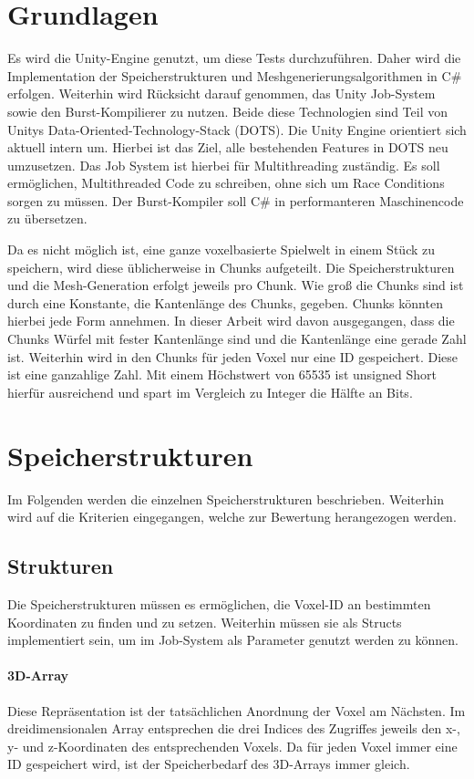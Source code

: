 \documentclass[
a4paper,     %
12pt         %
]{scrartcl}  %
\begin{document}
\section{Grundlagen}
Es wird die Unity-Engine genutzt, um diese Tests durchzuführen. Daher wird die Implementation der Speicherstrukturen und Meshgenerierungsalgorithmen in C\# erfolgen. Weiterhin wird Rücksicht darauf genommen, das Unity Job-System sowie den Burst-Kompilierer zu nutzen. Beide diese Technologien sind Teil von Unitys Data-Oriented-Technology-Stack (DOTS). Die Unity Engine orientiert sich aktuell intern um. Hierbei ist das Ziel, alle bestehenden Features in DOTS neu umzusetzen. Das Job System ist hierbei für Multithreading zuständig. Es soll ermöglichen, Multithreaded Code zu schreiben, ohne sich um Race Conditions sorgen zu müssen. Der Burst-Kompiler soll C\# in performanteren Maschinencode zu übersetzen.

Da es nicht möglich ist, eine ganze voxelbasierte Spielwelt in einem Stück zu speichern, wird diese üblicherweise in Chunks aufgeteilt. Die Speicherstrukturen und die Mesh-Generation erfolgt jeweils pro Chunk. Wie groß die Chunks sind ist durch eine Konstante, die Kantenlänge des Chunks, gegeben. Chunks könnten hierbei jede Form annehmen. In dieser Arbeit wird davon ausgegangen, dass die Chunks Würfel mit fester Kantenlänge sind und die Kantenlänge eine gerade Zahl ist. Weiterhin wird in den Chunks für jeden Voxel nur eine ID gespeichert. Diese ist eine ganzahlige Zahl. Mit einem Höchstwert von 65535 ist unsigned Short hierfür ausreichend und spart im Vergleich zu Integer die Hälfte an Bits.

\section{Speicherstrukturen}
Im Folgenden werden die einzelnen Speicherstrukturen beschrieben. Weiterhin wird auf die Kriterien eingegangen, welche zur Bewertung herangezogen werden.

\subsection{Strukturen}
Die Speicherstrukturen müssen es ermöglichen, die Voxel-ID an bestimmten Koordinaten zu finden und zu setzen. Weiterhin müssen sie als Structs implementiert sein, um im Job-System als Parameter genutzt werden zu können. 

\paragraph{3D-Array}
Diese Repräsentation ist der tatsächlichen Anordnung der Voxel am Nächsten. Im dreidimensionalen Array entsprechen die drei Indices des Zugriffes jeweils den x-, y- und z-Koordinaten des entsprechenden Voxels. Da für jeden Voxel immer eine ID gespeichert wird, ist der Speicherbedarf des 3D-Arrays immer gleich.
\end{document}
